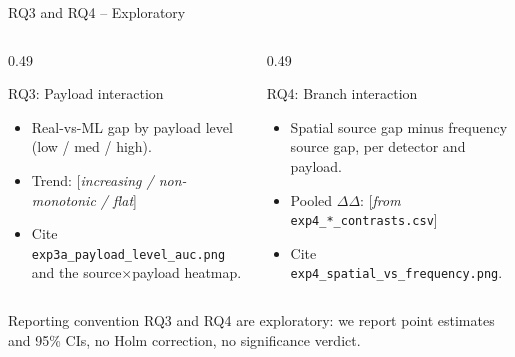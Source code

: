 \documentclass[aspectratio=169,11pt]{beamer}
\begin{document}
\begin{frame}{RQ3 and RQ4 -- Exploratory}
\small
\begin{columns}[T]
\begin{column}{0.49\textwidth}
\begin{block}{RQ3: Payload interaction}
\begin{itemize}
\item Real-vs-ML gap by payload level (low / med / high).
\item Trend: [\textit{increasing / non-monotonic / flat}]
\item Cite \texttt{exp3a\_payload\_level\_auc.png} and the source$\times$payload heatmap.
\end{itemize}
\end{block}
\end{column}
\begin{column}{0.49\textwidth}
\begin{block}{RQ4: Branch interaction}
\begin{itemize}
\item Spatial source gap minus frequency source gap, per detector and payload.
\item Pooled $\Delta\Delta$: [\textit{from} \texttt{exp4\_*\_contrasts.csv}]
\item Cite \texttt{exp4\_spatial\_vs\_frequency.png}.
\end{itemize}
\end{block}
\end{column}
\end{columns}
\vspace{0.1cm}
\begin{exampleblock}{Reporting convention}
RQ3 and RQ4 are exploratory: we report point estimates and 95\% CIs, no Holm correction, no significance verdict.
\end{exampleblock}
\end{frame}
\end{document}

